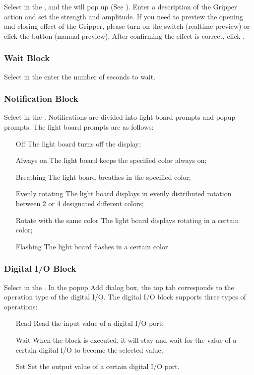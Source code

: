 Select  in the , and the  will pop up (See ). Enter a description of the Gripper action and set the strength and amplitude. If you need to preview the opening and closing effect of the Gripper, please turn on the  switch (real­time preview) or click the  button (manual preview). After confirming the effect is correct, click .

\subsubsection{Wait Block}
Select  in the  enter the number of seconds to wait.
\subsubsection{Notification Block}
Select  in the . Notifications are divided into light board prompts and pop­up prompts. The light board prompts are as follows:
\begin{itemize}[leftmargin=10em]
\item[Off] The light board turns off the display;
\item[Always on] The light board keeps the specified color always on;
\item[Breathing] The light board breathes in the specified color;
\item[Evenly rotating] The light board displays in evenly distributed rotation between 2 or 4 designated different colors;
\item[Rotate with the same color] The light board displays rotating in a certain color;
\item[Flashing] The light board flashes in a certain color.
\end{itemize}
\subsubsection{Digital I/O Block}
Select  in the . In the pop­up Add dialog box, the top tab corresponds to the operation type of the digital I/O. The digital I/O block supports three types of operations:
\begin{itemize}[leftmargin=4.5em]
\item[Read] Read the input value of a digital I/O port;
\item[Wait] When the block is executed, it will stay and wait for the value of a certain digital I/O to become the selected value;
\item[Set] Set the output value of a certain digital I/O port.
\end{itemize}

